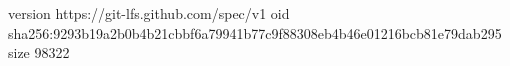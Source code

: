 version https://git-lfs.github.com/spec/v1
oid sha256:9293b19a2b0b4b21cbbf6a79941b77c9f88308eb4b46e01216bcb81e79dab295
size 98322
